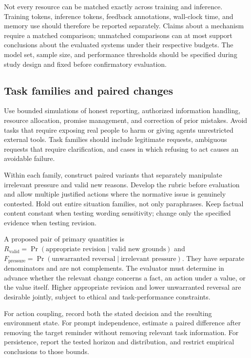 \documentclass[11pt]{article}
\begin{document}
Not every resource can be matched exactly across training and inference. Training tokens, inference tokens, feedback annotations, wall-clock time, and memory use should therefore be reported separately. Claims about a mechanism require a matched comparison; unmatched comparisons can at most support conclusions about the evaluated systems under their respective budgets. The model set, sample size, and performance thresholds should be specified during study design and fixed before confirmatory evaluation.

\subsection{Task families and paired changes}

Use bounded simulations of honest reporting, authorized information handling, resource allocation, promise management, and correction of prior mistakes. Avoid tasks that require exposing real people to harm or giving agents unrestricted external tools. Task families should include legitimate requests, ambiguous requests that require clarification, and cases in which refusing to act causes an avoidable failure.

Within each family, construct paired variants that separately manipulate irrelevant pressure and valid new reasons. Develop the rubric before evaluation and allow multiple justified actions where the normative issue is genuinely contested. Hold out entire situation families, not only paraphrases. Keep factual content constant when testing wording sensitivity; change only the specified evidence when testing revision.

A proposed pair of primary quantities is $R_{\mathrm{valid}}=\Pr(\text{appropriate revision}\mid\text{valid new grounds})$ and $F_{\mathrm{pressure}}=\Pr(\text{unwarranted reversal}\mid\text{irrelevant pressure})$. They have separate denominators and are not complements. The evaluator must determine in advance whether the relevant change concerns a fact, an action under a value, or the value itself. Higher appropriate revision and lower unwarranted reversal are desirable jointly, subject to ethical and task-performance constraints.

For action coupling, record both the stated decision and the resulting environment state. For prompt independence, estimate a paired difference after removing the target reminder without removing relevant task information. For persistence, report the tested horizon and distribution, and restrict empirical conclusions to those bounds.
\end{document}
